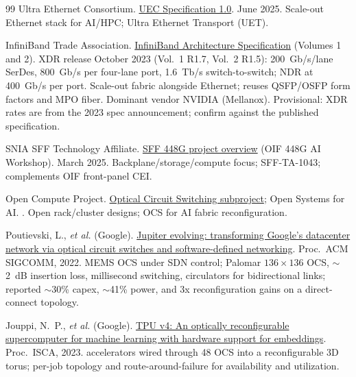 \begin{thebibliography}{99}
Ultra Ethernet Consortium.
\newblock \href{https://ultraethernet.org/specification/}{UEC Specification 1.0}.
\newblock June 2025.
\newblock Scale-out Ethernet stack for AI/HPC; Ultra Ethernet Transport (UET).

InfiniBand Trade Association.
\newblock \href{https://www.infinibandta.org/ibta-specification/}{InfiniBand Architecture Specification} (Volumes 1 and 2).
\newblock XDR release October 2023 (Vol.~1 R1.7, Vol.~2 R1.5): 200~Gb/s/lane
SerDes, 800~Gb/s per four-lane port, 1.6~Tb/s switch-to-switch; NDR at 400~Gb/s
per port. Scale-out fabric alongside Ethernet; reuses QSFP/OSFP form factors and
MPO fiber. Dominant vendor NVIDIA (Mellanox). Provisional: XDR rates are from the
2023 spec announcement; confirm against the published specification.

SNIA SFF Technology Affiliate.
\newblock \href{https://www.oiforum.com/wp-content/uploads/OIF_448G_AI_Workshop-SNIA-2025-03-31_v2_AConstantine.pdf}{SFF 448G project overview} (OIF 448G AI Workshop).
\newblock March 2025.
\newblock Backplane/storage/compute focus; SFF-TA-1043; complements OIF front-panel CEI.

Open Compute Project.
\newblock \href{https://www.opencompute.org/projects/optical-circuit-switching}{Optical Circuit Switching subproject}; Open Systems for AI.
.
\newblock Open rack/cluster designs; OCS for AI fabric reconfiguration.

Poutievski, L., \emph{et al.} (Google).
\newblock \href{https://doi.org/10.1145/3544216.3544265}{Jupiter evolving: transforming Google's datacenter network via optical circuit switches and software-defined networking}.
\newblock Proc.\ ACM SIGCOMM, 2022.
\newblock MEMS OCS under SDN control; Palomar $136\times136$ OCS, $\sim$2~dB insertion
loss, millisecond switching, circulators for bidirectional links; reported $\sim$30\%
capex, $\sim$41\% power, and 3x reconfiguration gains on a direct-connect topology.

Jouppi, N.~P., \emph{et al.} (Google).
\newblock \href{https://arxiv.org/abs/2304.01433}{TPU v4: An optically reconfigurable supercomputer for machine learning with hardware support for embeddings}.
\newblock Proc.\ ISCA, 2023.
 accelerators wired through 48 OCS into a reconfigurable 3D torus;
per-job topology and route-around-failure for availability and utilization.


\end{thebibliography}
